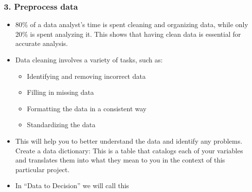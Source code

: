 \documentclass[letterpaper,10pt,english]{jupyterBook}
\begin{document}
\subsubsection{3. Pre\sphinxhyphen{}process data}
\label{\detokenize{1_Decision_making/Decision_making:pre-process-data}}\begin{itemize}
\item {} 
\sphinxAtStartPar
{} 80\% of a data analyst’s time is spent cleaning and organizing data, while only 20\% is spent analyzing it. This shows that having clean data is essential for accurate analysis.

\item {} 
\sphinxAtStartPar
{} Data cleaning involves a variety of tasks, such as:
\begin{itemize}
\item {} 
\sphinxAtStartPar
Identifying and removing incorrect data

\item {} 
\sphinxAtStartPar
Filling in missing data

\item {} 
\sphinxAtStartPar
Formatting the data in a consistent way

\item {} 
\sphinxAtStartPar
Standardizing the data

\end{itemize}

\item {} 
\sphinxAtStartPar
{} This will help you to better understand the data and identify any problems.
Create a data dictionary: This is a table that catalogs each of your variables and translates them into what they mean to you in the context of this particular project.

\item {} 
\sphinxAtStartPar
In “Data to Decision” we will call this 

\end{itemize}
\end{document}
